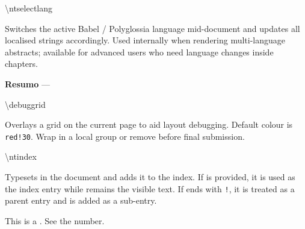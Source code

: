 \bigskip

\begin{macrodoc}{\textbackslash ntselectlang}

Switches the active Babel / Polyglossia language mid-document and
updates all \novathesis{} localised strings accordingly.  Used
internally when rendering multi-language abstracts; available for
advanced users who need language changes inside chapters.

\begin{latexcode}
\noindent\textbf{Resumo} — \lipsum[1]
\end{latexcode}
\end{macrodoc}

\bigskip

\begin{macrodoc}{\textbackslash debuggrid}

Overlays a grid on the current page to aid layout debugging.
Default colour is \texttt{red!30}.  Wrap in a local group or
remove before final submission.

\begin{latexcode}
\debuggrid[blue!20]   %
\end{latexcode}
\end{macrodoc}

\bigskip

\begin{macrodoc}{\textbackslash ntindex}

Typesets  in the document and adds it to the index.
If  is provided, it is used as the index entry while 
remains the visible text. If  ends with \texttt{!}, it is
treated as a parent entry and  is added as a sub-entry.

\begin{latexcode}
This is a .
See the  number.
\end{latexcode}
\end{macrodoc}

\bigskip


